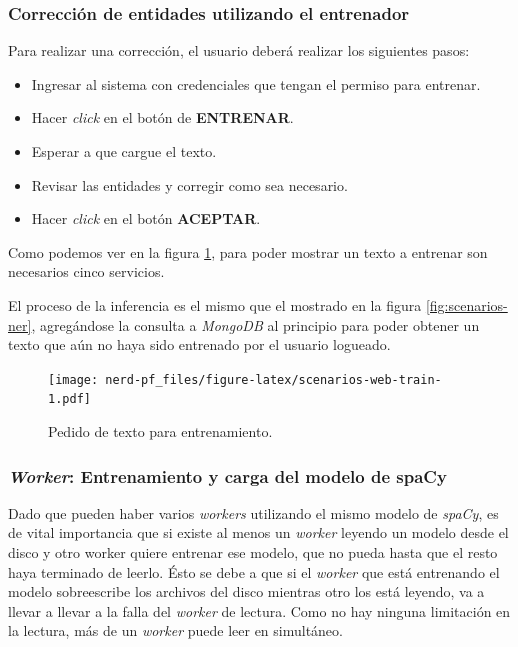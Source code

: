 \documentclass[12pt,a4paper,]{scrartcl}
\providecommand{\tightlist}{%
  \setlength{\itemsep}{0pt}\setlength{\parskip}{0pt}}
\begin{document}
\hypertarget{correcciuxf3n-de-entidades-utilizando-el-entrenador}{%
\subsubsection{Corrección de entidades utilizando el entrenador}\label{correcciuxf3n-de-entidades-utilizando-el-entrenador}}

Para realizar una corrección, el usuario deberá realizar los siguientes pasos:

\begin{itemize}
\tightlist
\item
  Ingresar al sistema con credenciales que tengan el permiso para entrenar.
\item
  Hacer \emph{click} en el botón de \textbf{ENTRENAR}.
\item
  Esperar a que cargue el texto.
\item
  Revisar las entidades y corregir como sea necesario.
\item
  Hacer \emph{click} en el botón \textbf{ACEPTAR}.
\end{itemize}

Como podemos ver en la figura \ref{fig:scenarios-web-train}, para poder mostrar un texto a entrenar son necesarios cinco servicios.

El proceso de la inferencia es el mismo que el mostrado en la figura \ref{fig:scenarios-ner}, agregándose la consulta a \emph{MongoDB} al principio para poder obtener un texto que aún no haya sido entrenado por el usuario logueado.

\begin{figure}[H]

{\centering \texttt{[image: nerd-pf\_files/figure-latex/scenarios-web-train-1.pdf]} 

}

\caption{Pedido de texto para entrenamiento.}\label{fig:scenarios-web-train}
\end{figure}

\hypertarget{worker-entrenamiento-y-carga-del-modelo-de-spacy}{%
\subsubsection{\texorpdfstring{\emph{Worker}: Entrenamiento y carga del modelo de spaCy}{Worker: Entrenamiento y carga del modelo de spaCy}}\label{worker-entrenamiento-y-carga-del-modelo-de-spacy}}

Dado que pueden haber varios \emph{workers} utilizando el mismo modelo de \emph{spaCy}, es de vital importancia que si existe al menos un \emph{worker} leyendo un modelo desde el disco y otro worker quiere entrenar ese modelo, que no pueda hasta que el resto haya terminado de leerlo.
Ésto se debe a que si el \emph{worker} que está entrenando el modelo sobreescribe los archivos del disco mientras otro los está leyendo, va a llevar a llevar a la falla del \emph{worker} de lectura. Como no hay ninguna limitación en la lectura, más de un \emph{worker} puede leer en simultáneo.
\end{document}
